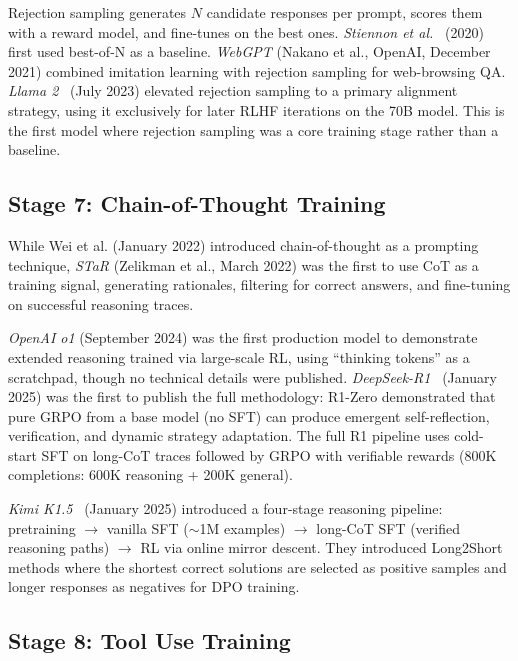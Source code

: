 \documentclass[12pt]{article}
\begin{document}
Rejection sampling generates $N$ candidate responses per prompt, scores them with a reward model, and fine-tunes on the best ones. \textit{Stiennon et al.}~\cite{Stiennon2020Summarize} (2020) first used best-of-N as a baseline. \textit{WebGPT} (Nakano et al., OpenAI, December 2021) combined imitation learning with rejection sampling for web-browsing QA. \textit{Llama 2}~\cite{Touvron2023Llama2} (July 2023) elevated rejection sampling to a primary alignment strategy, using it exclusively for later RLHF iterations on the 70B model. This is the first model where rejection sampling was a core training stage rather than a baseline.

\subsection{Stage 7: Chain-of-Thought Training}

While Wei et al. (January 2022) introduced chain-of-thought as a prompting technique, \textit{STaR} (Zelikman et al., March 2022) was the first to use CoT as a training signal, generating rationales, filtering for correct answers, and fine-tuning on successful reasoning traces.

\textit{OpenAI o1} (September 2024) was the first production model to demonstrate extended reasoning trained via large-scale RL, using ``thinking tokens'' as a scratchpad, though no technical details were published. \textit{DeepSeek-R1}~\cite{Guo2025DeepSeekR1} (January 2025) was the first to publish the full methodology: R1-Zero demonstrated that pure GRPO from a base model (no SFT) can produce emergent self-reflection, verification, and dynamic strategy adaptation. The full R1 pipeline uses cold-start SFT on long-CoT traces followed by GRPO with verifiable rewards (800K completions: 600K reasoning + 200K general).

\textit{Kimi K1.5}~\cite{Kimi2025K15} (January 2025) introduced a four-stage reasoning pipeline: pretraining $\rightarrow$ vanilla SFT ($\sim$1M examples) $\rightarrow$ long-CoT SFT (verified reasoning paths) $\rightarrow$ RL via online mirror descent. They introduced Long2Short methods where the shortest correct solutions are selected as positive samples and longer responses as negatives for DPO training.

\subsection{Stage 8: Tool Use Training}
\end{document}
